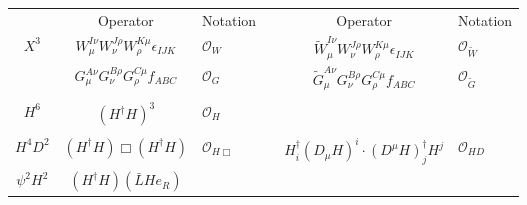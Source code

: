 \begin{table}
  \begin{center}
    \begin{tabular}{cclccl}
      \toprule
      & Operator & Notation & & Operator & Notation \\
      \cmidrule{2-3} \cmidrule{5-6}
      \multirow{2}{*}{$X^3$}
      &
        $W^{I\nu }_{\mu} W^{J\rho}_{\nu} W^{K \mu}_{\rho} \epsilon_{IJK} $ &
                                                                             $\mathcal{O}_{W}$ &
                              &
                                $\tilde{W}^{I \nu}_{\mu} W^{J\rho}_{\nu} W^{K\mu}_{\rho} \epsilon_{IJK}$ &
                                                                                                           $\mathcal{O}_{\tilde{W}}$ \\
      &
        $G^{A\nu}_\mu G^{B\rho}_\nu G^{C\mu}_\rho f_{ABC}$ &
                                                             $\mathcal{O}_{G}$ &
                              &
                                $\tilde{G}^{A\nu}_\mu G^{B\rho}_\nu G^{C\mu}_\rho f_{ABC}$ &
                                                                                             $\mathcal{O}_{\tilde{G}}$ \\[1mm]
      \midrule[0.25mm]
      \vspace{-5mm} & & & & \\
      $H^6$ &
              $(H^{\dagger} H)^3$ &
                                    $\mathcal{O}_{H}$ &
                              & & \\[1mm]
      \midrule[0.25mm]
      \vspace{-5mm} & & & & \\
      $H^4 D^2$ &
                  $(H^{\dagger} H )\Box (H^{\dagger} H)$ &
                                                           $\mathcal{O}_{H \Box}$ &
                              &
                                $H^{\dagger}_{i} (D_\mu H)^{i} \cdot (D^\mu H)_{j}^{\dagger} H^{j}$ &
                                                                                                      $\mathcal{O}_{H D}$ \\[1mm]
      \midrule[0.25mm]
      \multirow{2}{*}{$\psi^2 H^2$} &
                                      $(H^{\dagger} H) (\bar{L} H e_R)$ &

\end{tabular}
\end{center}
\end{table}
